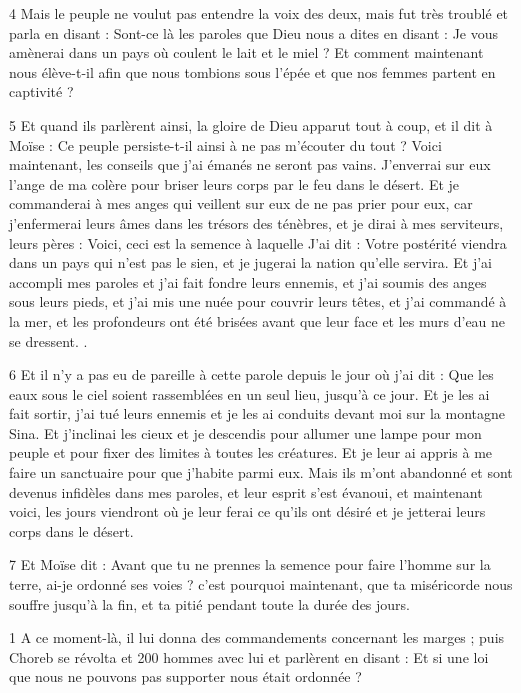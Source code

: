 \par 4 Mais le peuple ne voulut pas entendre la voix des deux, mais fut très troublé et parla en disant : Sont-ce là les paroles que Dieu nous a dites en disant : Je vous amènerai dans un pays où coulent le lait et le miel ? Et comment maintenant nous élève-t-il afin que nous tombions sous l'épée et que nos femmes partent en captivité ?

\par 5 Et quand ils parlèrent ainsi, la gloire de Dieu apparut tout à coup, et il dit à Moïse : Ce peuple persiste-t-il ainsi à ne pas m'écouter du tout ? Voici maintenant, les conseils que j'ai émanés ne seront pas vains. J'enverrai sur eux l'ange de ma colère pour briser leurs corps par le feu dans le désert. Et je commanderai à mes anges qui veillent sur eux de ne pas prier pour eux, car j'enfermerai leurs âmes dans les trésors des ténèbres, et je dirai à mes serviteurs, leurs pères : Voici, ceci est la semence à laquelle J'ai dit : Votre postérité viendra dans un pays qui n'est pas le sien, et je jugerai la nation qu'elle servira. Et j'ai accompli mes paroles et j'ai fait fondre leurs ennemis, et j'ai soumis des anges sous leurs pieds, et j'ai mis une nuée pour couvrir leurs têtes, et j'ai commandé à la mer, et les profondeurs ont été brisées avant que leur face et les murs d'eau ne se dressent. .

\par 6 Et il n'y a pas eu de pareille à cette parole depuis le jour où j'ai dit : Que les eaux sous le ciel soient rassemblées en un seul lieu, jusqu'à ce jour. Et je les ai fait sortir, j'ai tué leurs ennemis et je les ai conduits devant moi sur la montagne Sina. Et j'inclinai les cieux et je descendis pour allumer une lampe pour mon peuple et pour fixer des limites à toutes les créatures. Et je leur ai appris à me faire un sanctuaire pour que j'habite parmi eux. Mais ils m'ont abandonné et sont devenus infidèles dans mes paroles, et leur esprit s'est évanoui, et maintenant voici, les jours viendront où je leur ferai ce qu'ils ont désiré et je jetterai leurs corps dans le désert.

\par 7 Et Moïse dit : Avant que tu ne prennes la semence pour faire l'homme sur la terre, ai-je ordonné ses voies ? c'est pourquoi maintenant, que ta miséricorde nous souffre jusqu'à la fin, et ta pitié pendant toute la durée des jours.


\par 1 A ce moment-là, il lui donna des commandements concernant les marges ; puis Choreb se révolta et 200 hommes avec lui et parlèrent en disant : Et si une loi que nous ne pouvons pas supporter nous était ordonnée ?

